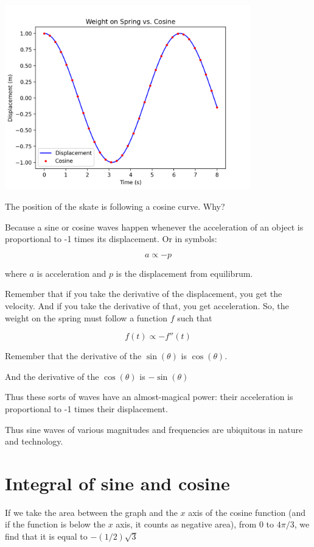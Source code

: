 \includegraphics[width=0.8\textwidth]{springpy.png}

The position of the skate is following a cosine curve. Why?

Because a sine or cosine waves happen whenever the acceleration of 
an object is proportional to -1 times its displacement. Or in symbols:

$$a \propto - p$$

where $a$ is acceleration and $p$ is the displacement from equilibrum.

Remember that if you take the derivative of the displacement, you get
the velocity. And if you take the derivative of that, you get
acceleration. So, the weight on the spring must follow a function $f$ such that

$$f(t) \propto - f''(t)$$

Remember that the derivative of the $\sin(\theta)$ is $\cos(\theta)$.

And the derivative of the $\cos(\theta)$ is $- \sin(\theta)$

Thus these sorts of waves have an almost-magical power: their
acceleration is proportional to -1 times their displacement.

Thus sine waves of various magnitudes and frequencies are ubiquitous
in nature and technology.

\section{Integral of sine and cosine}

If we take the area between the graph and the $x$ axis of the cosine
function (and if the function is below the $x$ axis, it counts as
negative area), from 0 to $4\pi/3$, we find that it is equal to
$-(1/2)\sqrt{3}$

